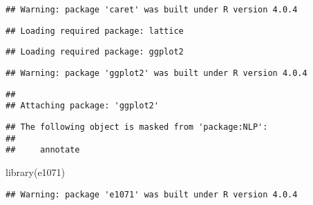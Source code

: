 \documentclass[
]{article}
\newenvironment{Shaded}{\begin{snugshade}}{\end{snugshade}}
\newcommand{\FunctionTok}[1]{\textcolor[rgb]{0.00,0.00,0.00}{#1}}
\newcommand{\NormalTok}[1]{#1}
\begin{document}
\begin{verbatim}
## Warning: package 'caret' was built under R version 4.0.4
\end{verbatim}

\begin{verbatim}
## Loading required package: lattice
\end{verbatim}

\begin{verbatim}
## Loading required package: ggplot2
\end{verbatim}

\begin{verbatim}
## Warning: package 'ggplot2' was built under R version 4.0.4
\end{verbatim}

\begin{verbatim}
## 
## Attaching package: 'ggplot2'
\end{verbatim}

\begin{verbatim}
## The following object is masked from 'package:NLP':
## 
##     annotate
\end{verbatim}

\begin{Shaded}
\begin{Highlighting}[]
\FunctionTok{library}\NormalTok{(e1071)}
\end{Highlighting}
\end{Shaded}

\begin{verbatim}
## Warning: package 'e1071' was built under R version 4.0.4
\end{verbatim}
\end{document}
